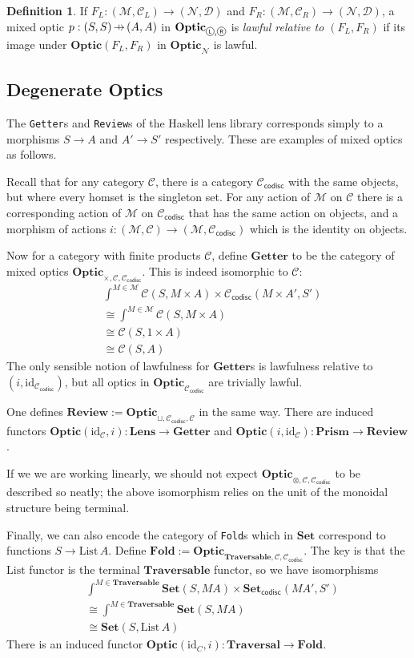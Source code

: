 \documentclass[11pt,letterpaper]{article}
\theoremstyle{plain}
\theoremstyle{definition}
\newtheorem{definition}[theorem]{Definition}
\newcommand{\C}{\mathscr{C}}
\newcommand{\D}{\mathscr{D}}
\newcommand{\M}{\mathscr{M}}
\newcommand{\N}{\mathscr{N}}
\newcommand{\Set}{\mathbf{Set}}
\newcommand{\Traversable}{\mathbf{Traversable}}
\newcommand{\Optic}{\mathbf{Optic}}
\newcommand{\Lens}{\mathbf{Lens}}
\newcommand{\Prism}{\mathbf{Prism}}
\newcommand{\Traversal}{\mathbf{Traversal}}
\newcommand{\Getter}{\mathbf{Getter}}
\newcommand{\Review}{\mathbf{Review}}
\newcommand{\Fold}{\mathbf{Fold}}
\newcommand{\id}{\mathrm{id}}
\newcommand{\codisc}{\mathsf{codisc}}
\newcommand*\circled[1]{\tikz[baseline={([yshift=-0.65ex]current bounding box.center)}]{
   \node[shape=circle,draw,inner sep=1pt] (char) {#1};}}
\newcommand{\actL}{{\circled{\tiny$\mathsf{L}$}}}
\newcommand{\actR}{{\circled{\tiny$\mathsf{R}$}}}
\newcommand{\hto}{\ensuremath{\,\mathaccent\shortmid\rightarrow\,}}
\begin{document}
\begin{definition}
If $F_L : (\M, \C_L) \to (\N, \D)$ and $F_R : (\M, \C_R) \to (\N, \D)$, a mixed optic $p : (S, S) \hto (A, A)$ in $\Optic_{\actL, \actR}$ is \emph{lawful relative to $(F_L, F_R)$} if its image under $\Optic(F_L, F_R)$ in $\Optic_\N$ is lawful.
\end{definition}

\subsection{Degenerate Optics}

The \texttt{Getter}s and \texttt{Review}s of the Haskell lens library corresponds simply to a morphisms $S \to A$ and $A' \to S'$ respectively. These are examples of mixed optics as follows.

Recall that for any category $\C$, there is a category $\C_\codisc$ with the same objects, but where every homset is the singleton set. For any action of $\M$ on $\C$ there is a corresponding action of $\M$ on $\C_\codisc$ that has the same action on objects, and a morphism of actions $i : (\M, \C) \to (\M, \C_\codisc)$ which is the identity on objects.

Now for a category with finite products $\C$, define $\Getter$ to be the category of mixed optics $\Optic_{\times, \C, \C_\codisc}$. This is indeed isomorphic to $\C$:
\begin{align*}
&\int^{M \in \M} \C(S, M \times A) \times \C_\codisc(M \times A', S')\\
&\cong \int^{M \in \M} \C(S, M \times A) \\
&\cong \C(S, 1 \times A) \\
&\cong \C(S, A)
\end{align*}
The only sensible notion of lawfulness for $\Getter$s is lawfulness relative to $(i, \id_{\C_\codisc})$, but all optics in $\Optic_{\C_\codisc}$ are trivially lawful.

One defines $\Review := \Optic_{\sqcup, \C_\codisc, \C}$ in the same way. There are induced functors $\Optic(\id_\C, i) : \Lens \to \Getter$ and $\Optic(i, \id_\C) : \Prism \to \Review$.

If we we are working linearly, we should not expect $\Optic_{\otimes, \C, \C_\codisc}$ to be described so neatly; the above isomorphism relies on the unit of the monoidal structure being terminal.

Finally, we can also encode the category of \texttt{Fold}s which in $\Set$ correspond to functions $S \to \mathrm{List}\,A$. Define $\Fold := \Optic_{\Traversable, \C, \C_\codisc}$. The key is that the $\mathrm{List}$ functor is the terminal $\Traversable$ functor, so we have isomorphisms
\begin{align*}
&\int^{M \in \Traversable} \Set(S, MA) \times \Set_\codisc(MA', S') \\
&\cong \int^{M \in \Traversable} \Set(S, MA) \\
&\cong \Set(S, \mathrm{List}\,A)
\end{align*}
There is an induced functor $\Optic(\id_C, i) : \Traversal \to \Fold$.
\end{document}
